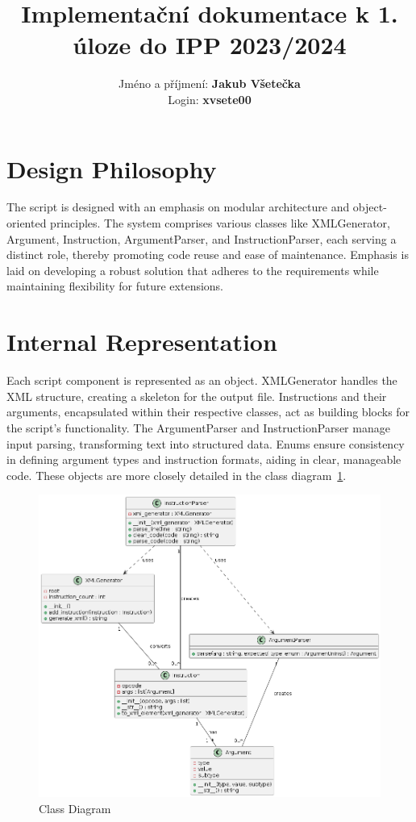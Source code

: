 \documentclass[10pt,a4paper]{article}
\title{Implementační dokumentace k \textbf{1}. úloze do IPP 2023/2024}
\author{Jméno a příjmení: \textbf{Jakub Všetečka} \\ Login: \textbf{xvsete00}}
\date{}
\begin{document}
\maketitle

\section{Design Philosophy}
The script is designed with an emphasis on modular architecture and object-oriented principles. The system comprises various classes like XMLGenerator, Argument, Instruction, ArgumentParser, and InstructionParser, each serving a distinct role, thereby promoting code reuse and ease of maintenance. Emphasis is laid on developing a robust solution that adheres to the requirements while maintaining flexibility for future extensions.

\section{Internal Representation}
Each script component is represented as an object. XMLGenerator handles the XML structure, creating a skeleton for the output file. Instructions and their arguments, encapsulated within their respective classes, act as building blocks for the script's functionality. The ArgumentParser and InstructionParser manage input parsing, transforming text into structured data. Enums ensure consistency in defining argument types and instruction formats, aiding in clear, manageable code. These objects are more closely detailed in the class
diagram~\ref{fig:classes}.

\begin{figure}[h]
    \centering
    \includegraphics[width=\textwidth]{imgs/classes.png}
    \caption{Class Diagram}
    \label{fig:classes}
    \end{figure}
\end{document}

